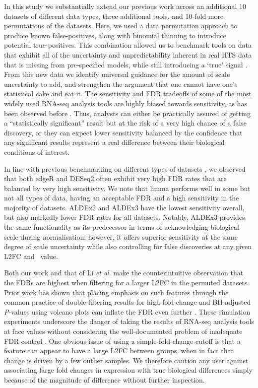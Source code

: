 \documentclass{article}
\begin{document}
In this study we substantially extend our previous work across an additional 10 datasets of different data types, three additional tools, and 10-fold more permutations of the datasets. Here, we used a data permutation approach \cite{li_exaggerated_2022} to produce known false-positives, along with binomial thinning \cite{gerard_data-based_2020} to introduce potential true-positives. This combination allowed us to benchmark tools on data that exhibit all of the uncertainty and unpredictability inherent in real HTS data that is missing from pre-specified models, while still introducing a `true' signal \cite{gerard_data-based_2020}. From this new data we identify universal guidance for the amount of scale uncertainty to add, and strengthen the argument that one cannot have one's statistical cake and eat it. The sensitivity and FDR tradeoffs of some of the most widely used RNA-seq analysis tools are highly biased towards sensitivity, as has been observed before \cite{hawinkel2017, Nearing:2022aa, li_exaggerated_2022}. Thus, analysts can either be practically assured of getting a ``statistically significant'' result but at the risk of a very high chance of a false discovery, or they can expect lower sensitivity balanced by the confidence that any significant results represent a real difference between their biological conditions of interest.

In line with previous benchmarking on different types of datasets \cite{hawinkel2017, Nearing:2022aa, li_exaggerated_2022}, we observed that both edgeR and DESeq2 often exhibit very high FDR rates that are balanced by very high sensitivity. We note that limma performs well in some but not all types of data, having an acceptable FDR and a high sensitivity in the majority of datasets. ALDEx2 and ALDEx3 have the lowest sensitivity overall, but also markedly lower FDR rates for all datasets. Notably, ALDEx3 provides the same functionality as its predecessor in terms of acknowledging biological scale during normalisation; however, it offers superior sensitivity at the same degree of scale uncertainty while also controlling for false discoveries at any given L2FC and \textgamma~value.

Both our work and that of Li \textit{et al}. make the counterintuitive observation that the FDRs are highest when filtering for a larger L2FC in the permuted datasets. Prior work has shown that placing emphasis on such features through the common practice of double-filtering results for high fold-change and BH-adjusted \textit{P}-values using volcano plots can inflate the FDR even further \cite{Cui:2003aa, bourgon_independent_2010}. These simulation experiments underscore the danger of taking the results of RNA-seq analysis tools at face values without considering the well-documented problem of inadequate FDR control \cite{witten2007comparison, Zhang:2009aa}. One obvious issue of using a simple-fold-change cutoff is that a feature can appear to have a large L2FC between groups, when in fact that change is driven by a few outlier samples. We therefore caution any user against associating large fold changes in expression with true biological differences simply because of the magnitude of difference without further inspection.
\end{document}
